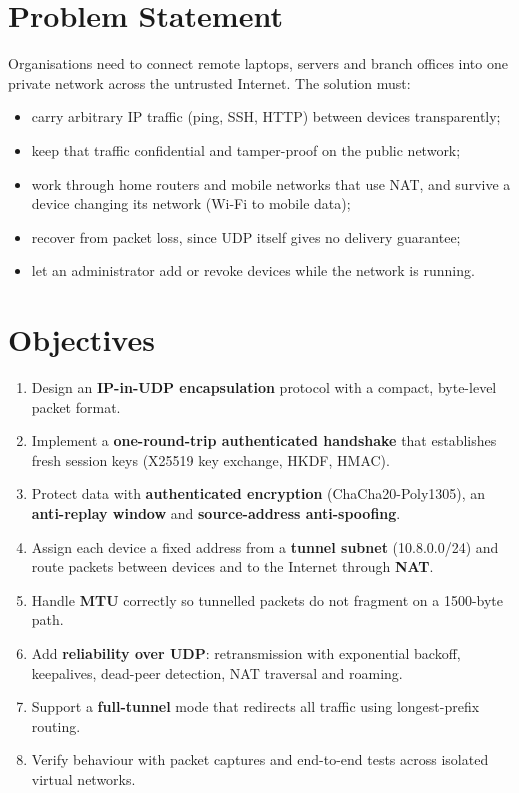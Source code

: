 \documentclass[12pt,a4paper]{article}
\begin{document}
\section{Problem Statement}
Organisations need to connect remote laptops, servers and branch offices into one
private network across the untrusted Internet. The solution must:
\begin{itemize}
  \item carry arbitrary IP traffic (ping, SSH, HTTP) between devices transparently;
  \item keep that traffic confidential and tamper-proof on the public network;
  \item work through home routers and mobile networks that use NAT, and survive a device
        changing its network (Wi-Fi to mobile data);
  \item recover from packet loss, since UDP itself gives no delivery guarantee;
  \item let an administrator add or revoke devices while the network is running.
\end{itemize}

\section{Objectives}
\begin{enumerate}
  \item Design an \textbf{IP-in-UDP encapsulation} protocol with a compact, byte-level packet format.
  \item Implement a \textbf{one-round-trip authenticated handshake} that establishes fresh
        session keys (X25519 key exchange, HKDF, HMAC).
  \item Protect data with \textbf{authenticated encryption} (ChaCha20-Poly1305), an
        \textbf{anti-replay window} and \textbf{source-address anti-spoofing}.
  \item Assign each device a fixed address from a \textbf{tunnel subnet} (10.8.0.0/24) and route
        packets between devices and to the Internet through \textbf{NAT}.
  \item Handle \textbf{MTU} correctly so tunnelled packets do not fragment on a 1500-byte path.
  \item Add \textbf{reliability over UDP}: retransmission with exponential backoff, keepalives,
        dead-peer detection, NAT traversal and roaming.
  \item Support a \textbf{full-tunnel} mode that redirects all traffic using longest-prefix routing.
  \item Verify behaviour with packet captures and end-to-end tests across isolated virtual networks.
\end{enumerate}
\end{document}
